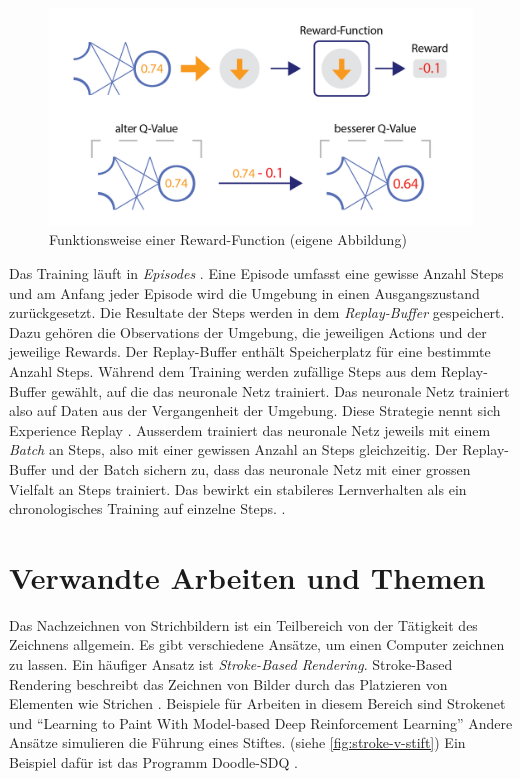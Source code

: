 \begin{figure}[!ht]
   \centering
   \includegraphics[width=\textwidth]{images/theorie/reinforce-2.png}
   \caption{Funktionsweise einer Reward-Function (eigene Abbildung)}\label{fig:reinforce-2}
\end{figure}
 
Das Training läuft in \emph{Episodes} \cite[S. 14]{sutton_reinforcement_2014}.
Eine Episode umfasst eine gewisse Anzahl Steps und am Anfang jeder Episode wird
die Umgebung in einen Ausgangszustand zurückgesetzt. Die Resultate der Steps
werden in dem \emph{Replay-Buffer} gespeichert. Dazu gehören die Observations
der Umgebung, die jeweiligen Actions und der jeweilige Rewards. Der
Replay-Buffer enthält Speicherplatz für eine bestimmte Anzahl Steps. Während dem
Training werden zufällige Steps aus dem Replay-Buffer gewählt, auf die das
neuronale Netz trainiert. Das neuronale Netz trainiert also auf Daten aus der
Vergangenheit der Umgebung. Diese Strategie nennt sich Experience Replay
\cite[S. 5]{mnih_playing_2013}. Ausserdem trainiert das neuronale Netz jeweils
mit einem \emph{Batch} an Steps, also mit einer gewissen Anzahl an Steps
gleichzeitig. Der Replay-Buffer und der Batch sichern zu, dass das neuronale
Netz mit einer grossen Vielfalt an Steps trainiert. Das bewirkt ein stabileres
Lernverhalten als ein chronologisches Training auf einzelne Steps.
\cite{phd_how_2021}.
 
 
\section{Verwandte Arbeiten und Themen}\label{chap:t_ver} Das Nachzeichnen von
Strichbildern ist ein Teilbereich von der Tätigkeit des Zeichnens allgemein. Es
gibt verschiedene Ansätze, um einen Computer zeichnen zu lassen. Ein häufiger
Ansatz ist \emph{Stroke-Based Rendering}. Stroke-Based Rendering beschreibt das
Zeichnen von Bilder durch das Platzieren von Elementen wie Strichen
\cite{aaron_hertzmann_stroke-based_2002}. Beispiele für Arbeiten in diesem Bereich sind
Strokenet \cite{zheng_strokenet_2018} und ``Learning to Paint With Model-based
Deep Reinforcement Learning'' \cite{huang_learning_2019} Andere Ansätze
simulieren die Führung eines Stiftes. (siehe \autoref{fig:stroke-v-stift}) Ein
Beispiel dafür ist das Programm Doodle-SDQ \cite{zhou_learning_2018}.
 
